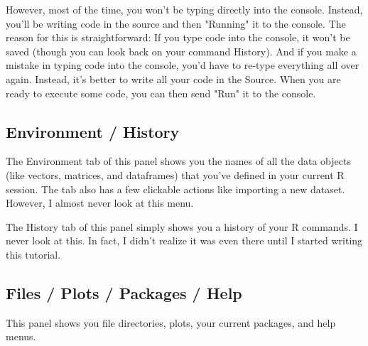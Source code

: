 \documentclass{tufte-book}\usepackage[]{graphicx}\usepackage[]{color}
\begin{document}

However, most of the time, you won't be typing directly into the console. Instead, you'll be writing code in the source and then "Running" it to the console. The reason for this is straightforward: If you type code into the console, it won't be saved (though you can look back on your command History). And if you make a mistake in typing code into the console, you'd have to re-type everything all over again. Instead, it's better to write all your code in the Source. When you are ready to execute some code, you can then send "Run" it to the console.

\subsection{Environment / History}

The Environment tab of this panel shows you the names of all the data objects (like vectors, matrices, and dataframes) that you've defined in your current R session. The tab also has a few clickable actions like importing a new dataset. However, I almost never look at this menu.

The History tab of this panel simply shows you a history of your R commands. I never look at this. In fact, I didn't realize it was even there until I started writing this tutorial.

\subsection{Files / Plots / Packages / Help}

This panel shows you file directories, plots, your current packages, and help menus.
\end{document}
